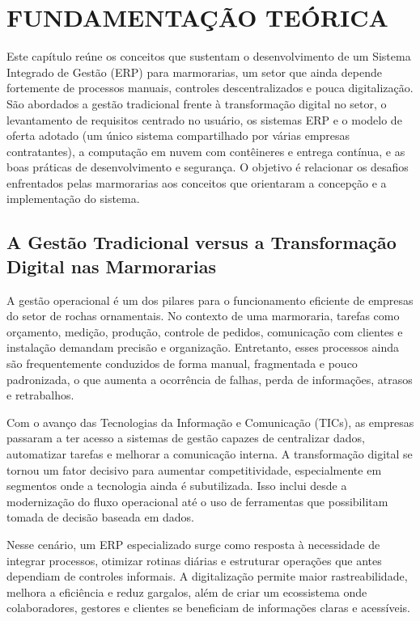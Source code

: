 \chapter{FUNDAMENTAÇÃO TEÓRICA}
\label{cap2FundamentosTecnicos}

Este capítulo reúne os conceitos que sustentam o desenvolvimento de um Sistema Integrado de Gestão (ERP) para marmorarias, um setor que ainda depende fortemente de processos manuais, controles descentralizados e pouca digitalização. São abordados a gestão tradicional frente à transformação digital no setor, o levantamento de requisitos centrado no usuário, os sistemas ERP e o modelo de oferta adotado (um único sistema compartilhado por várias empresas contratantes), a computação em nuvem com contêineres e entrega contínua, e as boas práticas de desenvolvimento e segurança. O objetivo é relacionar os desafios enfrentados pelas marmorarias aos conceitos que orientaram a concepção e a implementação do sistema.

\section{A Gestão Tradicional versus a Transformação Digital nas Marmorarias}
A gestão operacional é um dos pilares para o funcionamento eficiente de empresas do setor de rochas ornamentais. No contexto de uma marmoraria, tarefas como orçamento, medição, produção, controle de pedidos, comunicação com clientes e instalação demandam precisão e organização. Entretanto, esses processos ainda são frequentemente conduzidos de forma manual, fragmentada e pouco padronizada, o que aumenta a ocorrência de falhas, perda de informações, atrasos e retrabalhos.

Com o avanço das Tecnologias da Informação e Comunicação (TICs), as empresas passaram a ter acesso a sistemas de gestão capazes de centralizar dados, automatizar tarefas e melhorar a comunicação interna. A transformação digital se tornou um fator decisivo para aumentar competitividade, especialmente em segmentos onde a tecnologia ainda é subutilizada. Isso inclui desde a modernização do fluxo operacional até o uso de ferramentas que possibilitam tomada de decisão baseada em dados.

Nesse cenário, um ERP especializado surge como resposta à necessidade de integrar processos, otimizar rotinas diárias e estruturar operações que antes dependiam de controles informais. A digitalização permite maior rastreabilidade, melhora a eficiência e reduz gargalos, além de criar um ecossistema onde colaboradores, gestores e clientes se beneficiam de informações claras e acessíveis.

